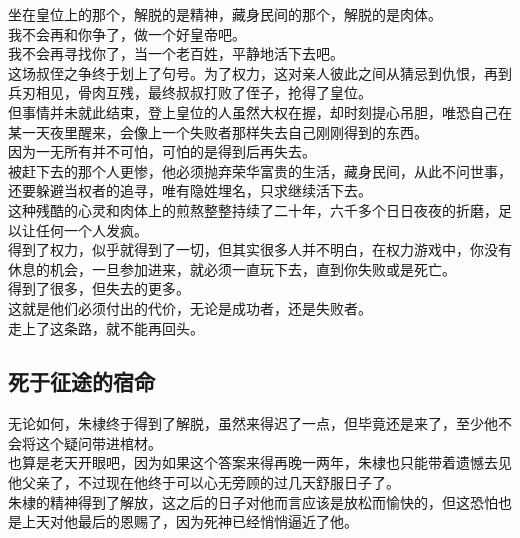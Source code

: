 \begin{multicols}{\theparacolNo}
坐在皇位上的那个，解脱的是精神，藏身民间的那个，解脱的是肉体。\\

我不会再和你争了，做一个好皇帝吧。\\

我不会再寻找你了，当一个老百姓，平静地活下去吧。\\

这场叔侄之争终于划上了句号。为了权力，这对亲人彼此之间从猜忌到仇恨，再到兵刃相见，骨肉互残，最终叔叔打败了侄子，抢得了皇位。\\

但事情并未就此结束，登上皇位的人虽然大权在握，却时刻提心吊胆，唯恐自己在某一天夜里醒来，会像上一个失败者那样失去自己刚刚得到的东西。\\

因为一无所有并不可怕，可怕的是得到后再失去。\\

被赶下去的那个人更惨，他必须抛弃荣华富贵的生活，藏身民间，从此不问世事，还要躲避当权者的追寻，唯有隐姓埋名，只求继续活下去。\\

这种残酷的心灵和肉体上的煎熬整整持续了二十年，六千多个日日夜夜的折磨，足以让任何一个人发疯。\\

得到了权力，似乎就得到了一切，但其实很多人并不明白，在权力游戏中，你没有休息的机会，一旦参加进来，就必须一直玩下去，直到你失败或是死亡。\\

得到了很多，但失去的更多。\\

这就是他们必须付出的代价，无论是成功者，还是失败者。\\

走上了这条路，就不能再回头。\\

\subsection{死于征途的宿命}
无论如何，朱棣终于得到了解脱，虽然来得迟了一点，但毕竟还是来了，至少他不会将这个疑问带进棺材。\\

也算是老天开眼吧，因为如果这个答案来得再晚一两年，朱棣也只能带着遗憾去见他父亲了，不过现在他终于可以心无旁顾的过几天舒服日子了。\\

朱棣的精神得到了解放，这之后的日子对他而言应该是放松而愉快的，但这恐怕也是上天对他最后的恩赐了，因为死神已经悄悄逼近了他。\\


\end{multicols}
